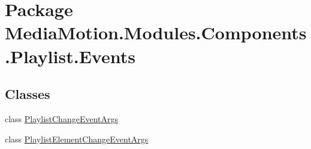 \hypertarget{namespace_media_motion_1_1_modules_1_1_components_1_1_playlist_1_1_events}{\section{Package Media\+Motion.\+Modules.\+Components.\+Playlist.\+Events}
\label{namespace_media_motion_1_1_modules_1_1_components_1_1_playlist_1_1_events}
}
\subsection*{Classes}
\begin{DoxyCompactItemize}
\item 
class \hyperlink{class_media_motion_1_1_modules_1_1_components_1_1_playlist_1_1_events_1_1_playlist_change_event_args}{Playlist\+Change\+Event\+Args}
\item 
class \hyperlink{class_media_motion_1_1_modules_1_1_components_1_1_playlist_1_1_events_1_1_playlist_element_change_event_args}{Playlist\+Element\+Change\+Event\+Args}
\end{DoxyCompactItemize}
